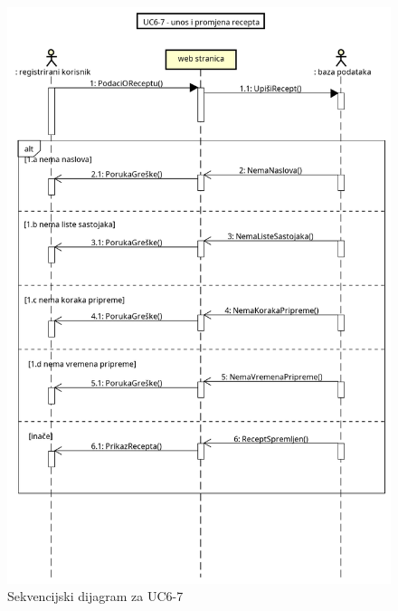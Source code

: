 				\begin{figure}[H]
					\centering
					\includegraphics[width=0.9\linewidth]{"slike/dijagrami/Seq 6-7"}
					\caption{Sekvencijski dijagram za UC6-7}
					\label{fig:seq-6-7}
				\end{figure}
				
